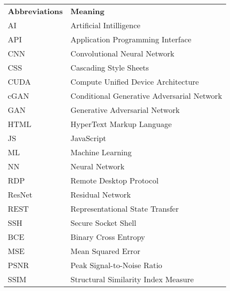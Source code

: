 \begin{table}[h]
	\begin{tabular}{l l}
		\textbf{Abbreviations} & \textbf{Meaning}                                               \\
		AI                     & Artificial Intilligence                                        \\
		 API     & Application Programming Interface                          \\
    CNN      & Convolutional Neural Network                              \\
    CSS      & Cascading Style Sheets                                    \\
    CUDA    & Compute Unified Device Architecture                        \\
    cGAN      & Conditional Generative Adversarial Network               \\
    GAN     & Generative Adversarial Network                             \\
    HTML     & HyperText Markup Language                                 \\
    JS    & JavaScript                                                  \\
    ML     & Machine Learning                                           \\
    NN     & Neural Network                                             \\
    RDP     & Remote Desktop Protocol                                    \\
    ResNet      & Residual Network                                        \\
    REST    & Representational State Transfer                            \\
    SSH     & Secure Socket Shell                                        \\
    BCE & Binary Cross Entropy                                         \\
    MSE & Mean Squared Error                                           \\
    PSNR & Peak Signal-to-Noise Ratio                                   \\
    SSIM & Structural Similarity Index Measure                          \\                         
	\end{tabular}
\end{table}
\pagebreak